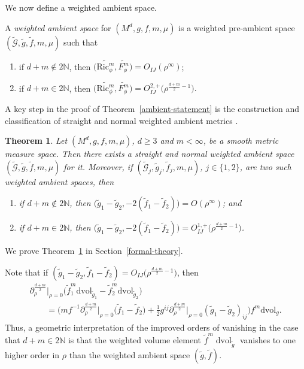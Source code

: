 \documentclass[pdftex]{sigma}
\newcommand{\cg}{\widetilde{g}}
\newcommand{\cf}{\widetilde{f}}
\newcommand{\cmG}{\widetilde{\mathcal{G}}}
\numberwithin{equation}{section}
\newtheorem{Theorem}{Theorem}[section]
\begin{document}
We now define a weighted ambient space.

\begin{Definition}
A \emph{weighted ambient space} for $(M^d,g,f,m,\mu)$ is a weighted pre-ambient space $(\cmG,\cg,\cf,m,\mu)$ such that
\begin{enumerate}[label=$(\roman*)$]\itemsep=0pt
\item if $d+m\notin 2\mathbb{N}$, then $\big(\widetilde{\mathrm{Ric}_\phi^m},\widetilde{F_\phi^m}\big)=O_{IJ}(\rho^{\infty})$;

\item if $d+m\in 2\mathbb{N}$, then $\big(\widetilde{\mathrm{Ric}_\phi^m},\widetilde{F_\phi^m}\big)=O^{2,+}_{IJ}\big(\rho^{\frac{d+m}{2}-1}\big).$
 \end{enumerate}
\end{Definition}

A key step in the proof of Theorem~\ref{ambient-statement} is the construction and classification of straight and normal weighted ambient metrics \cite{FeffermanGraham2012}.

\begin{Theorem}
 \label{weighted_ambient_metrics_exist}
 Let $(M^d,g,f,m,\mu)$, $d\geq 3$ and $m<\infty$, be a smooth metric measure space. Then there exists a straight and normal weighted ambient space $(\cmG,\cg,\cf,m,\mu)$ for it. Moreover, if $(\cmG_j,\cg_j,\cf_j,m,\mu)$, $j\in\{1,2\}$, are two such weighted ambient spaces, then
\begin{enumerate}[label=$(\roman*)$]\itemsep=0pt
 \item if $d+m\notin 2\mathbb{N}$, then $\big(\cg_1-\cg_2,-2(\cf_1-\cf_2)\big)=O(\rho^\infty)$; and
 \item if $d+m\in 2\mathbb{N}$, then $\big(\cg_1-\cg_2,-2(\cf_1-\cf_2)\big)=O_{IJ}^{1,+}\big(\rho^{\frac{d+m}{2}-1}\big)$.
 \end{enumerate}
\end{Theorem}

We prove Theorem~\ref{weighted_ambient_metrics_exist} in Section~\ref{formal-theory}.

Note that if $(\cg_1-\cg_2,\cf_1-\cf_2)=O_{IJ}\big(\rho^{\frac{d+m}{2}-1}\big)$, then
\begin{gather*}
{\partial^{\frac{d+m}{2}}_\rho}\big|_{\rho=0}\big(\widetilde{f}_1^m\mathrm{dvol}_{\widetilde{g}_1}- \widetilde{f}_2^m\mathrm{dvol}_{\widetilde{g}_2}\big)
\\ \qquad
{}= \biggl(mf^{-1}{\partial_\rho^{\frac{d+m}{2}}}\big|_{\rho=0}\big(\widetilde{f}_1-\widetilde{f}_2\big)
+\frac{1}{2}g^{ij}{\partial_\rho^{\frac{d+m}{2}}}\big|_{\rho=0} (\widetilde{g}_1-\widetilde{g}_2)_{ij}\biggr)f^m\mathrm{dvol}_{g}.
\end{gather*}
Thus, a geometric interpretation of the improved orders of vanishing in the case that $d+m\in 2\mathbb{N}$ is that the weighted volume element $\widetilde{f}^m\operatorname{dvol}_{\widetilde{g}}$ vanishes to one higher order in $\rho$ than the weighted ambient space $(\widetilde{g},\widetilde{f})$.
\end{document}
